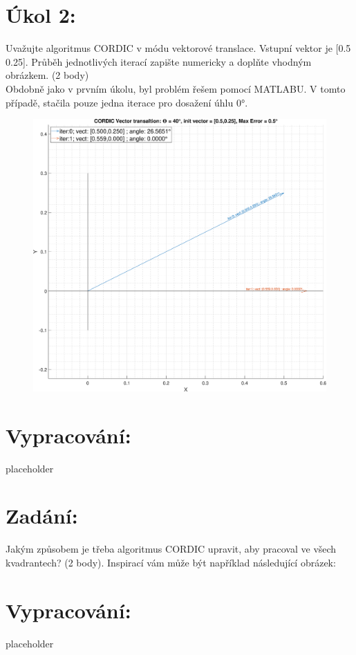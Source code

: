 \documentclass[10pt, a4paper]{article}%
\begin{document}
	\section{\Large Úkol 2:}
	Uvažujte algoritmus CORDIC v módu vektorové translace. Vstupní vektor je [0.5  0.25].
	Průběh jednotlivých iterací zapište numericky a doplňte vhodným obrázkem. (2 body)\\
	Obdobně jako v prvním úkolu, byl problém řešem pomocí MATLABU. V tomto případě,
	stačila pouze jedna iterace pro dosažení úhlu 0°.
	\begin{figure}[ht!]
		\centering
		\includegraphics[width = 1\textwidth]{CORDIC_vect_trans.eps}
		
	\end{figure}
	
	\section*{\Large Vypracování:}
	placeholder

	\section{\Large Zadání:}
	Jakým způsobem je třeba algoritmus CORDIC upravit, aby pracoval ve všech kvadrantech? (2 body).
	Inspirací vám může být například následující obrázek:

	\section*{\Large Vypracování:}
	placeholder
\end{document}
